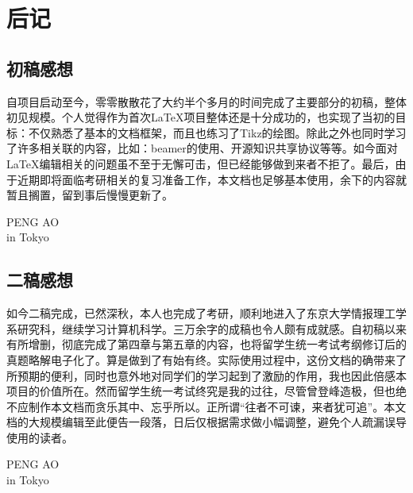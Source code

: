 
\chapter{后记}

\section*{初稿感想}
自项目启动至今，零零散散花了大约半个多月的时间完成了主要部分的初稿，整体初见规模。个人觉得作为首次\LaTeX 项目整体还是十分成功的，也实现了当初的目标：不仅熟悉了基本的文档框架，而且也练习了Tikz的绘图。除此之外也同时学习了许多相关联的内容，比如：beamer的使用、开源知识共享协议等等。如今面对\LaTeX 编辑相关的问题虽不至于无懈可击，但已经能够做到来者不拒了。最后，由于近期即将面临考研相关的复习准备工作，本文档也足够基本使用，余下的内容就暂且搁置，留到事后慢慢更新了。

\begin{flushright}
    PENG AO\\
     in Tokyo
\end{flushright}

\section*{二稿感想}

如今二稿完成，已然深秋，本人也完成了考研，顺利地进入了东京大学情报理工学系研究科，继续学习计算机科学。三万余字的成稿也令人颇有成就感。自初稿以来有所增删，彻底完成了第四章与第五章的内容，也将留学生统一考试考纲修订后的真题略解电子化了。算是做到了有始有终。实际使用过程中，这份文档的确带来了所预期的便利，同时也意外地对同学们的学习起到了激励的作用，我也因此倍感本项目的价值所在。然而留学生统一考试终究是我的过往，尽管曾登峰造极，但也绝不应制作本文档而贪乐其中、忘乎所以。正所谓“往者不可谏，来者犹可追”。本文档的大规模编辑至此便告一段落，日后仅根据需求做小幅调整，避免个人疏漏误导使用的读者。

\begin{flushright}
    PENG AO\\
     in Tokyo
\end{flushright}
